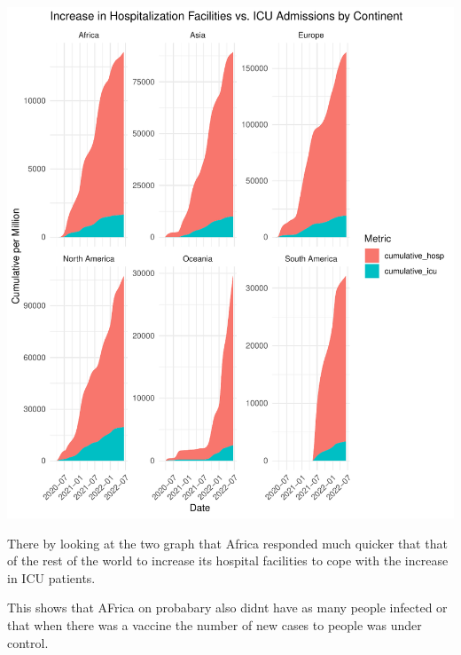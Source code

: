 \documentclass[12pt,preprint, authoryear]{elsarticle}
\let\origfigure\figure
\let\endorigfigure\endfigure
\renewenvironment{figure}[1][2] {
    \expandafter\origfigure\expandafter[H]
} {
    \endorigfigure
}
\numberwithin{equation}{section}
\numberwithin{figure}{section}
\numberwithin{table}{section}
\begin{document}
\begin{figure}[H]

{\centering \includegraphics{Q1_files/figure-latex/Figure6-1} 

}

\caption{Hospitalization VS ICU Admissions  \label{Figure6}}\label{fig:Figure6}
\end{figure}

There by looking at the two graph that Africa responded much quicker
that that of the rest of the world to increase its hospital facilities
to cope with the increase in ICU patients.

This shows that AFrica on probabary also didnt have as many people
infected or that when there was a vaccine the number of new cases to
people was under control.
\end{document}
